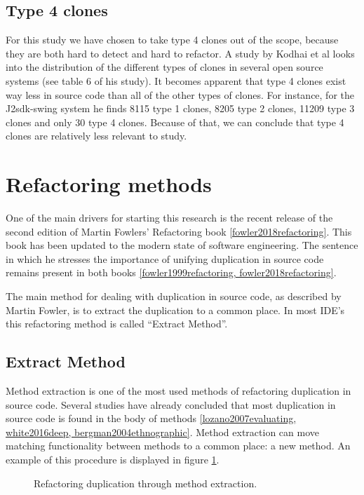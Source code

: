 \subsection{Type 4 clones}
For this study we have chosen to take type 4 clones out of the scope, because they are both hard to detect and hard to refactor. A study by Kodhai et al \cite{kodhai2013method} looks into the distribution of the different types of clones in several open source systems (see table 6 of his study). It becomes apparent that type 4 clones exist way less in source code than all of the other types of clones. For instance, for the J2sdk-swing system he finds 8115 type 1 clones, 8205 type 2 clones, 11209 type 3 clones and only 30 type 4 clones. Because of that, we can conclude that type 4 clones are relatively less relevant to study.

\section{Refactoring methods}
One of the main drivers for starting this research is the recent release of the second edition of Martin Fowlers' Refactoring book \ref{fowler2018refactoring}. This book has been updated to the modern state of software engineering. The sentence in which he stresses the importance of unifying duplication in source code remains present in both books \ref{fowler1999refactoring, fowler2018refactoring}.

The main method for dealing with duplication in source code, as described by Martin Fowler, is to extract the duplication to a common place. In most IDE's this refactoring method is called ``Extract Method''.

\subsection{Extract Method}
Method extraction is one of the most used methods of refactoring duplication in source code. Several studies have already concluded that most duplication in source code is found in the body of methods \ref{lozano2007evaluating, white2016deep, bergman2004ethnographic}. Method extraction can move matching functionality between methods to a common place: a new method. An example of this procedure is displayed in figure \ref{fig:extractmethod}.

\begin{figure}[H]
\begin{parcolumns}{2}
\end{parcolumns}
\caption{Refactoring duplication through method extraction.}
\label{fig:extractmethod}
\end{figure}

